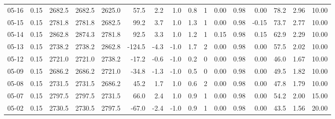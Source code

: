 \begin{threeparttable}
{\begin{tabular}{lrrrrrrrrrrrrrrr}
  05-16 &     0.15 & 2682.5 & 2682.5 & 2625.0 &       57.5 &            2.2 &                      1.0 &                 0.8 &              1 &       0.00 &      0.98 &           0.00 &             78.2 &            2.96 &                  10.00 \\
  05-15 &     0.15 & 2781.8 & 2781.8 & 2682.5 &       99.2 &            3.7 &                      1.0 &                 1.3 &              1 &       0.00 &      0.98 &          -0.15 &             73.7 &            2.77 &                  10.00 \\
  05-14 &     0.15 & 2862.8 & 2874.3 & 2781.8 &       92.5 &            3.3 &                      1.0 &                 1.2 &              1 &       0.15 &      0.98 &           0.15 &             62.9 &            2.29 &                  10.00 \\
  05-13 &     0.15 & 2738.2 & 2738.2 & 2862.8 &     -124.5 &           -4.3 &                     -1.0 &                 1.7 &              2 &       0.00 &      0.98 &           0.00 &             57.5 &            2.02 &                  10.00 \\
  05-12 &     0.15 & 2721.0 & 2721.0 & 2738.2 &      -17.2 &           -0.6 &                     -1.0 &                 0.2 &              0 &       0.00 &      0.98 &           0.00 &             46.0 &            1.67 &                  10.00 \\
  05-09 &     0.15 & 2686.2 & 2686.2 & 2721.0 &      -34.8 &           -1.3 &                     -1.0 &                 0.5 &              0 &       0.00 &      0.98 &           0.00 &             49.5 &            1.82 &                  10.00 \\
  05-08 &     0.15 & 2731.5 & 2731.5 & 2686.2 &       45.2 &            1.7 &                      1.0 &                 0.6 &              2 &       0.00 &      0.98 &           0.00 &             47.8 &            1.79 &                  10.00 \\
  05-07 &     0.15 & 2797.5 & 2797.5 & 2731.5 &       66.0 &            2.4 &                      1.0 &                 0.9 &              1 &       0.00 &      0.98 &           0.00 &             54.2 &            2.00 &                  15.00 \\
  05-02 &     0.15 & 2730.5 & 2730.5 & 2797.5 &      -67.0 &           -2.4 &                     -1.0 &                 0.9 &              1 &       0.00 &      0.98 &           0.00 &             43.5 &            1.56 &                  20.00 \\

\end{tabular}}
\end{threeparttable}
